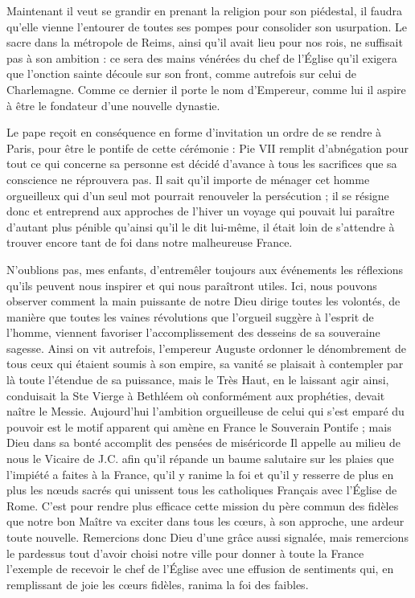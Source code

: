 \documentclass[11pt,a4paper]{report}
\begin{document}
Maintenant il veut se grandir en prenant la religion pour son piédestal, il faudra qu'elle vienne l'entourer de toutes ses pompes pour consolider son usurpation. Le sacre dans la métropole de Reims, ainsi qu'il avait lieu pour nos rois, ne suffisait pas à son ambition : ce sera des mains vénérées du chef de l'Église qu'il exigera que l'onction sainte découle sur son front, comme autrefois sur celui de Charlemagne. Comme ce dernier il porte le nom d'Empereur, comme lui il aspire à être le fondateur d'une nouvelle dynastie.

Le pape reçoit en conséquence en forme d'invitation un ordre de se rendre à Paris, pour être le pontife de cette cérémonie : Pie VII remplit d'abnégation pour tout ce qui concerne sa personne est décidé d'avance à tous les sacrifices que sa conscience ne réprouvera pas. Il sait qu'il importe de ménager cet homme orgueilleux qui d'un seul mot pourrait renouveler la persécution ; il se résigne donc et entreprend aux approches de l'hiver un voyage qui pouvait lui paraître d'autant plus pénible qu'ainsi qu'il le dit lui-même, il était loin de s'attendre à trouver encore tant de foi dans notre malheureuse France.

N'oublions pas, mes enfants, d'entremêler toujours aux événements les réflexions qu'ils peuvent nous inspirer et qui nous paraîtront utiles. Ici, nous pouvons observer comment la main puissante de notre Dieu dirige toutes les volontés, de manière que toutes les vaines révolutions que l'orgueil suggère à l'esprit de l'homme, viennent favoriser l'accomplissement des desseins de sa souveraine sagesse. Ainsi on vit autrefois, l'empereur Auguste ordonner le dénombrement de tous ceux qui étaient soumis à son empire, sa vanité se plaisait à contempler par là toute l'étendue de sa puissance, mais le Très Haut, en le laissant agir ainsi, conduisait la Ste Vierge à Bethléem où conformément aux prophéties, devait naître le Messie. Aujourd'hui l'ambition orgueilleuse de celui qui s'est emparé du pouvoir est le motif apparent qui amène en France le Souverain Pontife ; mais Dieu dans sa bonté accomplit des pensées de miséricorde Il appelle au milieu de nous le Vicaire de J.C. afin qu'il répande un baume salutaire sur les plaies que l'impiété a faites à la France, qu'il y ranime la foi et qu'il y resserre de plus en plus les nœuds sacrés qui unissent tous les catholiques Français avec l'Église de Rome. C'est pour rendre plus efficace cette mission du père commun des fidèles que notre bon Maître va exciter dans tous les cœurs, à son approche, une ardeur toute nouvelle. Remercions donc Dieu d'une grâce aussi signalée, mais remercions le pardessus tout d'avoir choisi notre ville pour donner à toute la France l'exemple de recevoir le chef de l'Église avec une effusion de sentiments qui, en remplissant de joie les cœurs fidèles, ranima la foi des faibles.
\end{document}
